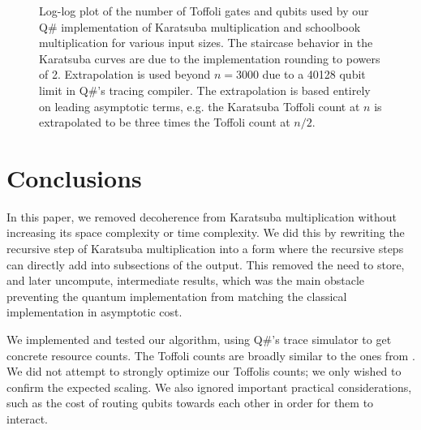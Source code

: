 \documentclass[onecolumn,unpublished]{quantumarticle}
\begin{document}
\begin{figure}
    \centering
    \caption{
    \label{fig:data}
    Log-log plot of the number of Toffoli gates and qubits used by our Q\# implementation of Karatsuba multiplication and schoolbook multiplication for various input sizes.
    The staircase behavior in the Karatsuba curves are due to the implementation rounding to powers of 2.
    Extrapolation is used beyond $n=3000$ due to a 40128 qubit limit in Q\#'s tracing compiler.
    The extrapolation is based entirely on leading asymptotic terms, e.g. the Karatsuba Toffoli count at $n$ is extrapolated to be three times the Toffoli count at $n/2$.
    }
\end{figure}

\section{Conclusions}
\label{sec:conclusion}

In this paper, we removed decoherence from Karatsuba multiplication without increasing its space complexity or time complexity.
We did this by rewriting the recursive step of Karatsuba multiplication into a form where the recursive steps can directly add into subsections of the output.
This removed the need to store, and later uncompute, intermediate results, which was the main obstacle preventing the quantum implementation from matching the classical implementation in asymptotic cost.

We implemented and tested our algorithm, using Q\#'s trace simulator to get concrete resource counts.
The Toffoli counts are broadly similar to the ones from \cite{parent2017karatsuba}.
We did not attempt to strongly optimize our Toffolis counts; we only wished to confirm the expected scaling.
We also ignored important practical considerations, such as the cost of routing qubits towards each other in order for them to interact.
\end{document}
